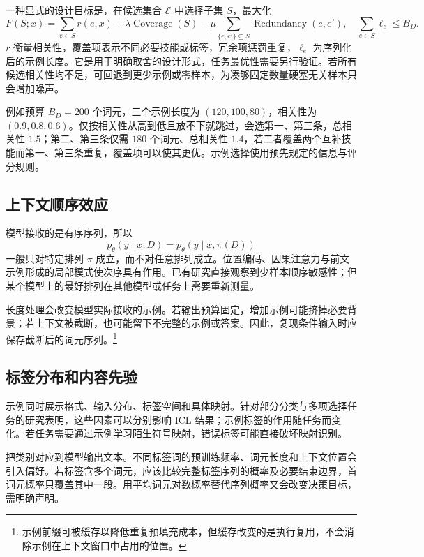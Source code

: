 \documentclass[../textbook.tex]{subfiles}
\begin{document}
一种显式的设计目标是，在候选集合 $\mathcal E$ 中选择子集 $S$，最大化
\begin{equation}
F(S;x)=\sum_{e\in S}r(e,x)+\lambda\operatorname{Coverage}(S)
-\mu\sum_{\{e,e'\}\subseteq S}\operatorname{Redundancy}(e,e'),
\quad \sum_{e\in S}\ell_e\le B_D.
\label{eq:icl-selection}
\end{equation}
$r$ 衡量相关性，覆盖项表示不同必要技能或标签，冗余项惩罚重复，$\ell_e$ 为序列化后的示例长度。它是用于明确取舍的设计形式，任务最优性需要另行验证。若所有候选相关性均不足，可回退到更少示例或零样本，为凑够固定数量硬塞无关样本只会增加噪声。

例如预算 $B_D=200$ 个词元，三个示例长度为 $(120,100,80)$，相关性为 $(0.9,0.8,0.6)$。仅按相关性从高到低且放不下就跳过，会选第一、第三条，总相关性 $1.5$；第二、第三条仅需 $180$ 个词元、总相关性 $1.4$，若二者覆盖两个互补技能而第一、第三条重复，覆盖项可以使其更优。示例选择使用预先规定的信息与评分规则。

\subsection{上下文顺序效应}
模型接收的是有序序列，所以
\begin{equation}
p_\theta(y\mid x,D)=p_\theta(y\mid x,\pi(D))
\end{equation}
一般只对特定排列 $\pi$ 成立，而不对任意排列成立。位置编码、因果注意力与前文示例形成的局部模式使次序具有作用。已有研究直接观察到少样本顺序敏感性\cite{lu2022orderedprompts}；但某个模型上的最好排列在其他模型或任务上需要重新测量。

长度处理会改变模型实际接收的示例。若输出预算固定，增加示例可能挤掉必要背景；若上下文被截断，也可能留下不完整的示例或答案。因此，复现条件输入时应保存截断后的词元序列。\footnote{示例前缀可被缓存以降低重复预填充成本，但缓存改变的是执行复用，不会消除示例在上下文窗口中占用的位置。}

\subsection{标签分布和内容先验}
示例同时展示格式、输入分布、标签空间和具体映射。针对部分分类与多项选择任务的研究表明，这些因素可以分别影响 ICL 结果\cite{min2022demonstrations}；示例标签的作用随任务而变化。若任务需要通过示例学习陌生符号映射，错误标签可能直接破坏映射识别。

把类别对应到模型输出文本。不同标签词的预训练频率、词元长度和上下文位置会引入偏好。若标签含多个词元，应该比较完整标签序列的概率及必要结束边界，首词元概率只覆盖其中一段。用平均词元对数概率替代序列概率又会改变决策目标，需明确声明。
\end{document}
